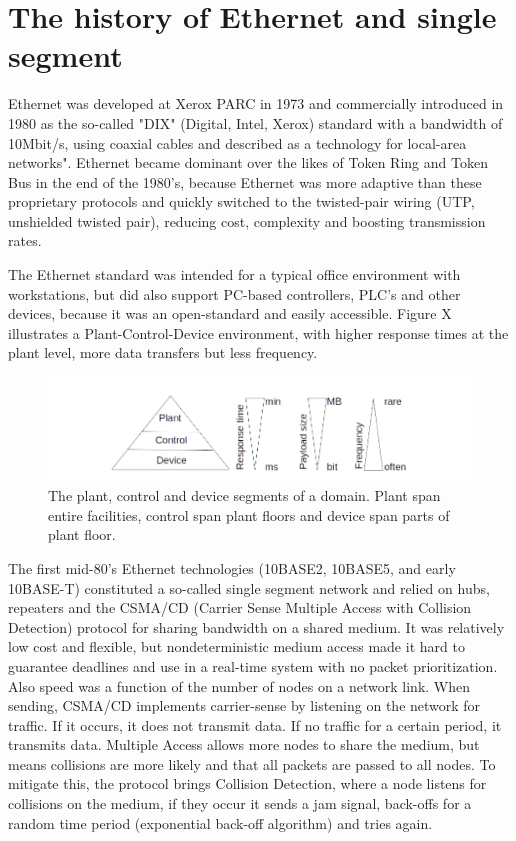 \section{The history of Ethernet and single segment}

Ethernet was developed at Xerox PARC in 1973 and commercially introduced in 1980 as the so-called "DIX" (Digital, Intel, Xerox) standard with a bandwidth of 10Mbit/s, using coaxial cables and described as a technology for local-area networks". Ethernet became dominant over the likes of Token Ring and Token Bus in the end of the 1980's, because Ethernet was more adaptive than these proprietary protocols and quickly switched to the twisted-pair wiring (UTP, unshielded twisted pair), reducing cost, complexity and boosting transmission rates.

\noindent The Ethernet standard was intended for a typical office environment with workstations, but did also support PC-based controllers, PLC's and other devices, because it was an open-standard and easily accessible. Figure X illustrates a Plant-Control-Device environment, with higher response times at the plant level, more data transfers but less frequency.

\begin{figure}[h!]\label{}
	\centering
	\includegraphics[scale=0.5]{realTimeEthernet/PlantControlDevice.png}
	\caption{The plant, control and device segments of a domain. Plant span entire facilities, control span plant floors and device span parts of plant floor.}
	\label{fig:plantcontroldevice}
\end{figure}

\noindent The first mid-80's Ethernet technologies (10BASE2, 10BASE5, and early 10BASE-T) constituted a so-called single segment network and relied on hubs, repeaters and the CSMA/CD (Carrier Sense Multiple Access with Collision Detection) protocol for sharing bandwidth on a shared medium. It was relatively low cost and flexible, but nondeterministic medium access made it hard to guarantee deadlines and use in a real-time system with no packet prioritization. Also speed was a function of the number of nodes on a network link. When sending, CSMA/CD implements carrier-sense by listening on the network for traffic. If it occurs, it does not transmit data. If no traffic for a certain period, it transmits data. Multiple Access allows more nodes to share the medium, but means collisions are more likely and that all packets are passed to all nodes. To mitigate this, the protocol brings Collision Detection, where a node listens for collisions on the medium, if they occur it sends a jam signal, back-offs for a random time period (exponential back-off algorithm) and tries again.

